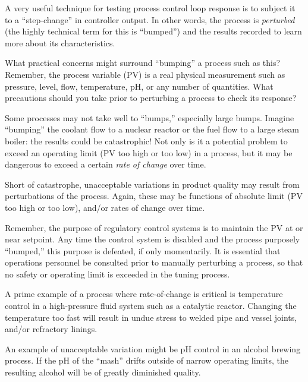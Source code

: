

A very useful technique for testing process control loop response is to subject it to a ``step-change'' in controller output.  In other words, the process is {\it perturbed} (the highly technical term for this is ``bumped'') and the results recorded to learn more about its characteristics.

What practical concerns might surround ``bumping'' a process such as this?  Remember, the process variable (PV) is a real physical measurement such as pressure, level, flow, temperature, pH, or any number of quantities.  What precautions should you take prior to perturbing a process to check its response?







Some processes may not take well to ``bumps,'' especially large bumps.  Imagine ``bumping'' the coolant flow to a nuclear reactor or the fuel flow to a large steam boiler: the results could be catastrophic!  Not only is it a potential problem to exceed an operating limit (PV too high or too low) in a process, but it may be dangerous to exceed a certain {\it rate of change} over time.  

Short of catastrophe, unacceptable variations in product quality may result from perturbations of the process.  Again, these may be functions of absolute limit (PV too high or too low), and/or rates of change over time.

Remember, the purpose of regulatory control systems is to maintain the PV at or near setpoint.  Any time the control system is disabled and the process purposely ``bumped,'' this purpose is defeated, if only momentarily.  It is essential that operations personnel be consulted prior to manually perturbing a process, so that no safety or operating limit is exceeded in the tuning process.







A prime example of a process where rate-of-change is critical is temperature control in a high-pressure fluid system such as a catalytic reactor.  Changing the temperature too fast will result in undue stress to welded pipe and vessel joints, and/or refractory linings.

An example of unacceptable variation might be pH control in an alcohol brewing process.  If the pH of the ``mash'' drifts outside of narrow operating limits, the resulting alcohol will be of greatly diminished quality.




